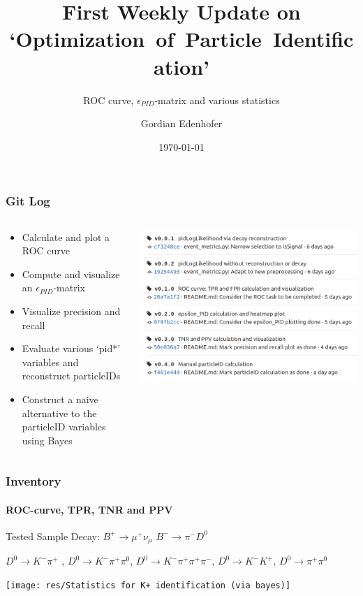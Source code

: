 \documentclass{beamer}
\title{First Weekly Update on `Optimization~of~Particle~Identification'}
\subtitle{ROC curve, $\epsilon_{PID}$-matrix and various statistics}
\author{Gordian Edenhofer}
\date{\today}
\begin{document}
\begin{frame}
	\frametitle{Git Log}

	\begin{columns}[T]
		\begin{column}{.5\textwidth}
			\begin{itemize}
				\item Calculate and plot a ROC curve
				\item Compute and visualize an $\epsilon_{PID}$-matrix
				\item Visualize precision and recall
				\item Evaluate various `pid*' variables and reconstruct particleIDs
				\item Construct a naive alternative to the particleID variables using Bayes
			\end{itemize}
		\end{column}
		\begin{column}{.5\textwidth}
			\includegraphics[width=1\linewidth]{res/01-git tags.png}
		\end{column}
	\end{columns}
\end{frame}

\begin{frame}
	\frametitle{Inventory}
	\framesubtitle{ROC-curve, TPR, TNR and PPV}

	Tested Sample Decay: \hspace{2em}
	$B^+ \rightarrow \mu^+ \nu_{\mu}$
	\hspace{2em}
	$B^- \rightarrow \pi^- D^0$
	\\
	\begin{addmargin}[1em]{0em}
		$D^0 \rightarrow K^- \pi^+$ ,
		$D^0 \rightarrow K^- \pi^+ \pi^0$,
		$D^0 \rightarrow K^- \pi^+ \pi^+ \pi^-$,
		$D^0 \rightarrow K^- K^+$,
		$D^0 \rightarrow \pi^+ \pi^0$
	\end{addmargin}

	\vspace{1em}

	\centering
	\texttt{[image: res/Statistics for K+ identification (via bayes)]}
\end{frame}
\end{document}
